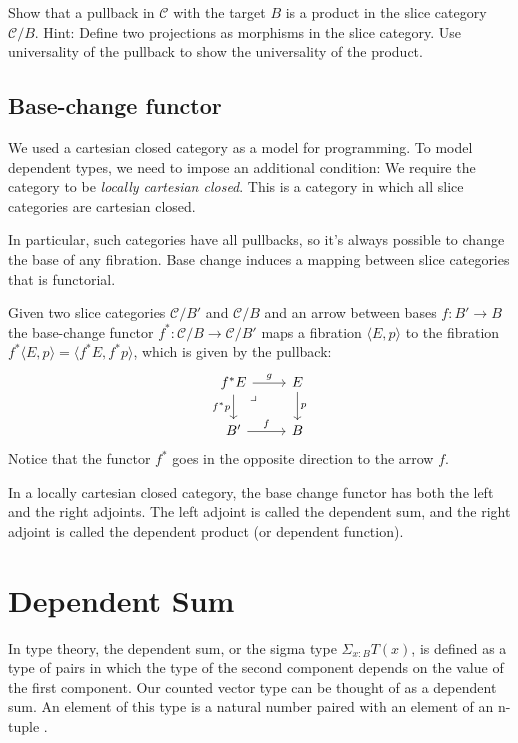 \documentclass[DaoFP]{subfiles}
\begin{document}
\begin{exercise}
Show that a pullback in $\mathcal{C}$ with the target $B$ is a product in the slice category $\mathcal{C}/B$. Hint: Define two projections  as morphisms in the slice category. Use universality of the pullback to show the universality of the product.
\end{exercise}


\subsection{Base-change functor}

We used a cartesian closed category as a model for programming. To model dependent types, we need to impose an additional condition: We require the category to be \emph{locally cartesian closed}. This is a category in which all slice categories are cartesian closed. 

In particular, such categories have all pullbacks, so it's always possible to change the base of any fibration.  Base change induces a mapping between slice categories that is functorial. 

Given two slice categories $\mathcal{C}/B'$ and $\mathcal{C}/B$ and an arrow between bases $f \colon B' \to B$ the base-change functor $f^* \colon \mathcal{C}/B \to \mathcal{C}/B'$ maps a fibration $\langle E, p \rangle$ to the fibration $ f^* \langle E, p \rangle= \langle f^* E, f^* p \rangle$, which is given by the pullback:
\[
 \begin{tikzcd}
f^* E
\arrow[dr, phantom,  , very near start, "\lrcorner"]
 \arrow[d, "f^*p"']
 \arrow[r, "g"]
 & E
 \arrow[d, "p"]
 \\
 B'
 \arrow[r, "f"]
 &B
  \end{tikzcd}
\]
Notice that the functor $f^*$ goes in the opposite direction to the arrow $f$.

In a locally cartesian closed category, the base change functor has both the left and the right adjoints. The left adjoint is called the dependent sum, and the right adjoint is called the dependent product (or dependent function).

\section{Dependent Sum}

In type theory, the dependent sum, or the sigma type $\Sigma_{x : B} T(x)$, is defined as a type of pairs in which the type of the second component depends on the value of the first component. Our counted vector type can be thought of as a dependent sum. An element of this type is a natural number  paired with an element of an n-tuple .
\end{document}
